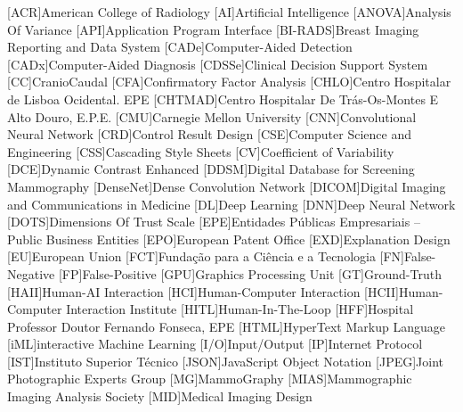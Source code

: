 
\begin{acronym}[H.264/SVC]
[ACR]{American College of Radiology}
[AI]{Artificial Intelligence}
[ANOVA]{Analysis Of Variance}
[API]{Application Program Interface}
[BI-RADS]{Breast Imaging Reporting and Data System}
[CADe]{Computer-Aided Detection}
[CADx]{Computer-Aided Diagnosis}
[CDSSe]{Clinical Decision Support System}
[CC]{CranioCaudal}
[CFA]{Confirmatory Factor Analysis}
[CHLO]{Centro Hospitalar de Lisboa Ocidental. EPE}
[CHTMAD]{Centro Hospitalar De Tr\'{a}s-Os-Montes E Alto Douro, E.P.E.}
[CMU]{Carnegie Mellon University}
[CNN]{Convolutional Neural Network}
[CRD]{Control Result Design}
[CSE]{Computer Science and Engineering}
[CSS]{Cascading Style Sheets}
[CV]{Coefficient of Variability}
[DCE]{Dynamic Contrast Enhanced}
[DDSM]{Digital Database for Screening Mammography}
[DenseNet]{Dense Convolution Network}
[DICOM]{Digital Imaging and Communications in Medicine}
[DL]{Deep Learning}
[DNN]{Deep Neural Network}
[DOTS]{Dimensions Of Trust Scale}
[EPE]{Entidades Públicas Empresariais -- Public Business Entities}
[EPO]{European Patent Office}
[EXD]{Explanation Design}
[EU]{European Union}
[FCT]{Funda\c{c}\~{a}o para a Ci\^{e}ncia e a Tecnologia}
[FN]{False-Negative}
[FP]{False-Positive}
[GPU]{Graphics Processing Unit}
[GT]{Ground-Truth}
[HAII]{Human-AI Interaction}
[HCI]{Human-Computer Interaction}
[HCII]{Human-Computer Interaction Institute}
[HITL]{Human-In-The-Loop}
[HFF]{Hospital Professor Doutor Fernando Fonseca, EPE}
[HTML]{HyperText Markup Language}
[iML]{interactive Machine Learning}
[I/O]{Input/Output}
[IP]{Internet Protocol}
[IST]{Instituto Superior T\'{e}cnico}
[JSON]{JavaScript Object Notation}
[JPEG]{Joint Photographic Experts Group}
[MG]{MammoGraphy}
[MIAS]{Mammographic Imaging Analysis Society}
[MID]{Medical Imaging Design}

\end{acronym}

